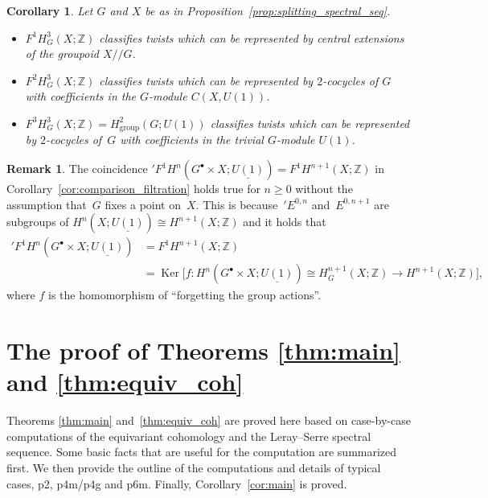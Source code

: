 \documentclass[pdftex]{sigma}
\newtheorem{cor}[thm]{Corollary}
\theoremstyle{definition}
\newtheorem{rem}[thm]{Remark}
\newcommand{\Z}{\mathbb{Z}}
\begin{document}
\begin{cor} \label{cor:twist_interpretation}
Let $G$ and $X$ be as in Proposition~{\rm \ref{prop:splitting_spectral_seq}}.
\begin{itemize}\itemsep=0pt
\item[$(i)$]
$F^1H^3_G(X; \Z)$ classifies twists which can be represented by central extensions of the groupoid $X/\!/G$.

\item[$(ii)$]
$F^2H^3_G(X; \Z)$ classifies twists which can be represented by $2$-cocycles of $G$ with coefficients in the $G$-module $C(X, U(1))$.

\item[$(iii)$]
$F^3H^3_G(X; \Z) = H^2_{\mathrm{group}}(G; U(1))$ classifies twists which can be represented by $2$-cocycles of~$G$ with coefficients in the trivial $G$-module $U(1)$.
\end{itemize}
\end{cor}

\begin{rem}
The coincidence ${}'F^1H^n(G^\bullet \times X; \underline{U(1)}) = F^1H^{n+1}(X; \Z)$ in Corollary~\ref{cor:comparison_filtration} holds true for $n \ge 0$ without the assumption that~$G$ f\/ixes a point on~$X$. This is because~${}'E^{0, n}$ and~$E^{0, n+1}$ are subgroups of $H^n(X; \underline{U(1)}) \cong H^{n+1}(X; \Z)$ and it holds that
\begin{align*}
{}'F^1H^n(G^\bullet \times X; \underline{U(1)})&= F^1H^{n+1}(X; \Z) \\
&= \operatorname{Ker}\big[f \colon H^n(G^\bullet \times X; \underline{U(1)})\cong H^{n+1}_G(X; \Z) \to H^{n+1}(X; \Z)\big],
\end{align*}
where $f$ is the homomorphism of ``forgetting the group actions''.
\end{rem}

\section{The proof of Theorems \ref{thm:main} and \ref{thm:equiv_coh}}\label{sec:proof_main_theorem}

Theorems \ref{thm:main} and~\ref{thm:equiv_coh} are proved here based on case-by-case computations of the equivariant cohomology and the Leray--Serre spectral sequence. Some basic facts that are useful for the computation are summarized f\/irst. We then provide the outline of the computations and details of typical cases, \textsf{p2}, \textsf{p4m/p4g} and \textsf{p6m}. Finally, Corollary~\ref{cor:main} is proved.
\end{document}
